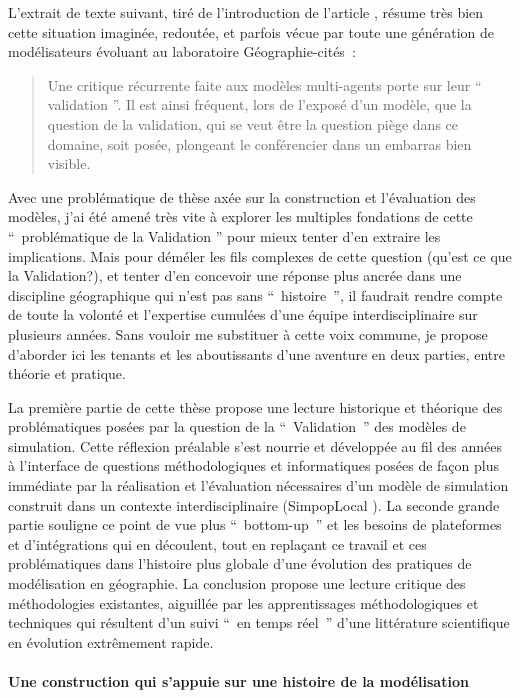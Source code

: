 L’extrait de texte suivant, tiré de l'introduction de l'article \autocite{Amblard2006},⁠ résume très bien cette situation imaginée, redoutée, et parfois vécue par toute une génération de modélisateurs évoluant au laboratoire Géographie-cités : 

\blockquote[\cite{Amblard2006}]{Une critique récurrente faite aux modèles multi-agents porte sur leur \enquote{ validation }. Il est ainsi fréquent, lors de l'exposé d'un modèle, que la question de la validation, qui se veut être la question piège dans ce domaine, soit posée, plongeant le conférencier dans un embarras bien visible.}

Avec une problématique de thèse axée sur la construction et l'évaluation des modèles, j’ai été amené très vite à explorer les multiples fondations de cette \enquote{ problématique de la Validation } pour mieux tenter d'en extraire les implications. Mais pour déméler les fils complexes de cette question (qu'est ce que la Validation?), et tenter d'en concevoir une réponse plus ancrée dans une discipline géographique qui n'est pas sans \enquote{ histoire }, il faudrait rendre compte de toute la volonté et l'expertise cumulées d'une équipe interdisciplinaire sur plusieurs années. Sans vouloir me substituer à cette voix commune, je propose d'aborder ici les tenants et les aboutissants d'une aventure en deux parties, entre théorie et pratique.

La première partie de cette thèse propose une lecture historique et théorique des problématiques posées par la question de la \enquote{ Validation } des modèles de simulation. Cette réflexion préalable s'est nourrie et développée au fil des années à l'interface de questions méthodologiques et informatiques posées de façon plus immédiate par la réalisation et l'évaluation nécessaires d'un modèle de simulation construit dans un contexte interdisciplinaire (SimpopLocal \autocite{Schmitt2015}). La seconde grande partie souligne ce point de vue plus \foreignquote{english}{ bottom-up } et les besoins de plateformes et d'intégrations qui en découlent, tout en replaçant ce travail et ces problématiques dans l'histoire plus globale d'une évolution des pratiques  de modélisation en géographie. La conclusion propose une lecture critique des méthodologies existantes, aiguillée par les apprentissages méthodologiques et techniques qui résultent d’un suivi \enquote{ en temps réel } d’une littérature scientifique en évolution extrêmement rapide.  

\paragraph*{Une construction qui s’appuie sur une histoire de la modélisation}

